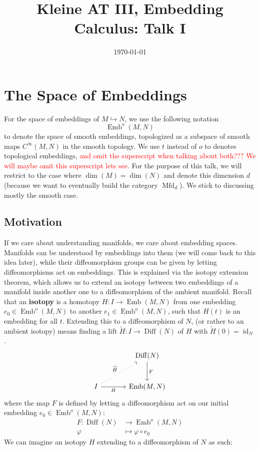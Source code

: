 \documentclass{amsart}
\DeclareMathOperator{\Emb}{Emb}
\DeclareMathOperator{\Mfd}{Mfd}
\DeclareMathOperator{\Diff}{Diff}
\theoremstyle{definition}
\theoremstyle{remark}
\theoremstyle{example}
\begin{document}
\title{Kleine AT III, Embedding Calculus: Talk I}
\date{\today}


\maketitle

\tableofcontents

\section{The Space of Embeddings}

For the space of embeddings of $M \hookrightarrow N$, we use the following notation
\[
\Emb^o(M, N)
\]
to denote the space of smooth embeddings, topologized as a subspace of smooth maps $C^{\infty}(M,N)$ in the smooth topology. We use $t$ instead of $o$ to denotes topological embeddings, \textcolor{red}{and omit the superscript when talking about both??? We will maybe omit this superscript lets see}. For the purpose of this talk, we will restrict to the case where $\dim(M) = \dim(N)$ and denote this dimension $d$ (because we want to eventually build the category $\Mfd_d$). We stick to discussing mostly the smooth case.

\subsection{Motivation}

If we care about understanding manifolds, we care about embedding spaces. Manifolds can be understood by embeddings into them (we will come back to this idea later), while their diffeomorphism groups can be given by letting diffeomorphisms act on embeddings. This is explained via the isotopy extension theorem, which  allows us to extend an isotopy between two embeddings of a manifold inside another one to a diffeomorphism of the ambient manifold. Recall that an \textbf{isotopy} is a homotopy $H \colon I \to \Emb(M, N)$ from one embedding $e_0 \in  \Emb^o(M,N)$ to another $e_1 \in \Emb^o(M,N)$, such that $H(t)$ is an embedding for all $t$. Extending this to a diffeomorphism of $N$, (or rather to an ambient isotopy) means finding a lift $\widetilde H:I\to\operatorname{Diff}(N)$ of $H$ with $\widetilde H(0)=\operatorname{id}_N$.
\begin{equation}\label{eq:isotopy-extension-diagram}
\begin{tikzcd}[row sep=large, column sep=large]
    & \Diff(N) \arrow[d, "F"] \\
    I \arrow[r, "H"'] \arrow[ur, dotted, "\widetilde H"] & \Emb(M,N)
\end{tikzcd}
\end{equation}
where the map $F$ is defined by letting a diffeomorphism act on our initial embedding $e_0 \in \Emb^o(M,N)$:
    \[
    \begin{aligned}
        F \colon \Diff(N) &\to \Emb^o(M,N) \\
        \varphi &\mapsto \varphi \circ e_0
    \end{aligned}
    \]
We can imagine an isotopy $H$ extending to a diffeomorphism of $N$ as such:
\end{document}

